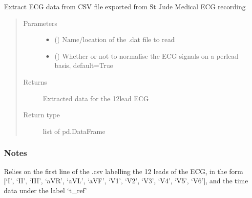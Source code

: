 \documentclass[letterpaper,10pt,english]{sphinxmanual}
\begin{document}
\begin{fulllineitems}
\label{\detokenize{_autosummary/signalanalysis.ecg.read_ecg_from_csv:signalanalysis.ecg.read_ecg_from_csv}}
\sphinxAtStartPar
Extract ECG data from CSV file exported from St Jude Medical ECG recording
\begin{quote}\begin{description}
\item[{Parameters}] \leavevmode\begin{itemize}
\item {} 
\sphinxAtStartPar
{} () \textendash{} Name/location of the .dat file to read

\item {} 
\sphinxAtStartPar
{} (\sphinxstyleliteralemphasis{\sphinxupquote{, }}) \textendash{} Whether or not to normalise the ECG signals on a per\sphinxhyphen{}lead basis, default=True

\end{itemize}

\item[{Returns}] \leavevmode
\sphinxAtStartPar
{} \textendash{} Extracted data for the 12\sphinxhyphen{}lead ECG

\item[{Return type}] \leavevmode
\sphinxAtStartPar
list of pd.DataFrame

\end{description}\end{quote}
\subsubsection*{Notes}

\sphinxAtStartPar
Relies on the first line of the .csv labelling the 12 leads of the ECG, in the form {[}‘I’, ‘II’, ‘III’,  ‘aVR’,
‘aVL’, ‘aVF’, ‘V1’, ‘V2’, ‘V3’, ‘V4’, ‘V5’, ‘V6’{]}, and the time data under the label ‘t\_ref’

\end{fulllineitems}
\end{document}
